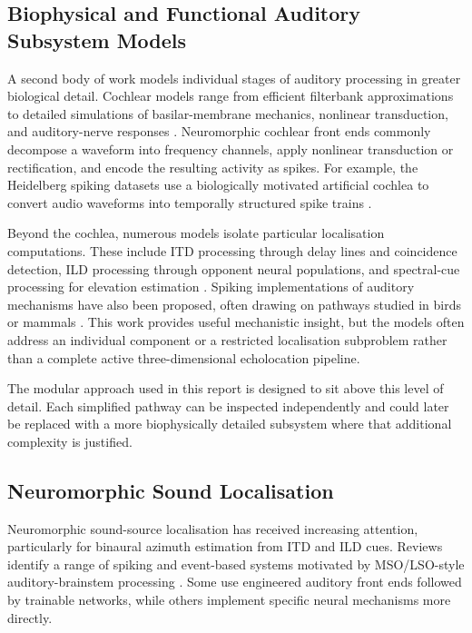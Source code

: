 \subsection{Biophysical and Functional Auditory Subsystem Models}

A second body of work models individual stages of auditory processing in greater biological detail. Cochlear models range from efficient filterbank approximations to detailed simulations of basilar-membrane mechanics, nonlinear transduction, and auditory-nerve responses \cite{deBoer1980AuditoryI,Sieroka2006SemirealisticCochlea,Pennington2023ACortex,ApplyingAudiology}. Neuromorphic cochlear front ends commonly decompose a waveform into frequency channels, apply nonlinear transduction or rectification, and encode the resulting activity as spikes. For example, the Heidelberg spiking datasets use a biologically motivated artificial cochlea to convert audio waveforms into temporally structured spike trains \cite{Cramer2022TheNetworks}.

Beyond the cochlea, numerous models isolate particular localisation computations. These include ITD processing through delay lines and coincidence detection, ILD processing through opponent neural populations, and spectral-cue processing for elevation estimation \cite{Lazar2008FaithfulNeurons,Moro2022NeuromorphicTransducers,Tanveer2021EstimateStudy,OssesVecchiAProcessing}. Spiking implementations of auditory mechanisms have also been proposed, often drawing on pathways studied in birds or mammals \cite{Wall2012SpikingDifference,Goldsworthy2022ComputationalStimulation,Biswas2022ModelingOscillators}. This work provides useful mechanistic insight, but the models often address an individual component or a restricted localisation subproblem rather than a complete active three-dimensional echolocation pipeline.

The modular approach used in this report is designed to sit above this level of detail. Each simplified pathway can be inspected independently and could later be replaced with a more biophysically detailed subsystem where that additional complexity is justified.

\subsection{Neuromorphic Sound Localisation}

Neuromorphic sound-source localisation has received increasing attention, particularly for binaural azimuth estimation from ITD and ILD cues. Reviews identify a range of spiking and event-based systems motivated by MSO/LSO-style auditory-brainstem processing \cite{Danneville2024ASystems}. Some use engineered auditory front ends followed by trainable networks, while others implement specific neural mechanisms more directly.

